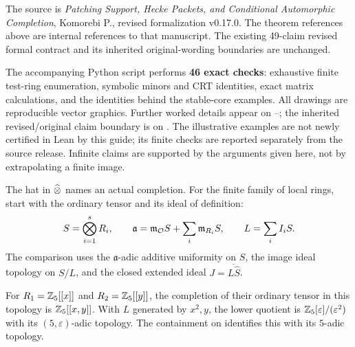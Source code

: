 The source is \emph{Patching Support, Hecke Packets, and Conditional Automorphic Completion}, Komorebi P., revised formalization v0.17.0. The theorem references above are internal references to that manuscript. The existing 49-claim revised formal contract and its inherited original-wording boundaries are unchanged.

The accompanying Python script performs \textbf{46 exact checks}: exhaustive finite test-ring enumeration, symbolic minors and CRT identities, exact matrix calculations, and the identities behind the stable-core examples. All drawings are reproducible vector graphics. Further worked details appear on --; the inherited revised/original claim boundary is on . The illustrative examples are not newly certified in Lean by this guide; its finite checks are reported separately from the source release. Infinite claims are supported by the arguments given here, not by extrapolating a finite image.

\setlength{\parskip}{5pt}
The hat in $\mathbin{\widehat\otimes}$ names an actual completion. For the finite family of local rings, start with the ordinary tensor and its ideal of definition:
\[
 S=\bigotimes_{i=1}^s R_i,\qquad
 \mathfrak a=\mathfrak m_{\mathcal O}S+\sum_i\mathfrak m_{R_i}S,\qquad L=\sum_i I_iS.
\]
The comparison uses the $\mathfrak a$-adic additive uniformity on $S$, the image ideal topology on $S/L$, and the closed extended ideal $J=\overline{L\widehat S}$.


For $R_1=\mathbb Z_5[[x]]$ and $R_2=\mathbb Z_5[[y]]$, the completion of their ordinary tensor in this topology is $\mathbb Z_5[[x,y]]$. With $L$ generated by $x^2,y$, the lower quotient is $\mathbb Z_5[\varepsilon]/(\varepsilon^2)$ with its $(5,\varepsilon)$-adic topology. The containment on  identifies this with its $5$-adic topology.

